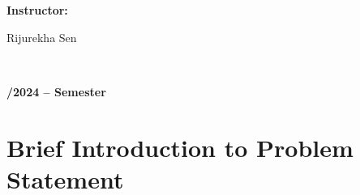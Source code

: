 \documentclass[12pt]{article}
\begin{document}
\begin{flushleft}
    \textbf{\selectfont Instructor:}
\end{flushleft}

\vspace{-0.5 cm}

\begin{flushleft}
    \selectfont  Rijurekha Sen                 
\end{flushleft}

\begin{flushleft}
    \large { }\\[4.0cm]
\end{flushleft}
\vspace{-2.0cm}    
\begin{center}
    \large \bf {}/2024 --  Semester
\end{center}

\thispagestyle{empty}

\setcounter{page}{0}

\newpage

\tableofcontents 
\setcounter{page}{1}
\newpage

\section{Brief Introduction to Problem Statement}
\end{document}
